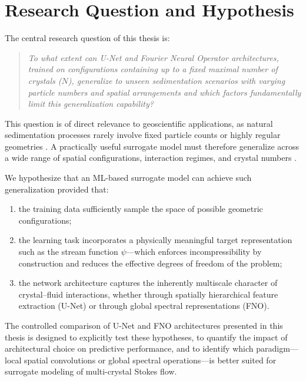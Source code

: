 \section{Research Question and Hypothesis}

The central research question of this thesis is:

\begin{quote}
\emph{To what extent can U-Net and Fourier Neural Operator architectures, trained on configurations containing up to a fixed maximal number of crystals ($N$), generalize to unseen sedimentation scenarios with varying particle numbers and spatial arrangements and which factors fundamentally limit this generalization capability?}
\end{quote}

This question is of direct relevance to geoscientific applications, as natural sedimentation processes rarely involve fixed particle counts or highly regular geometries \parencite{martin_crystal_1988,verhoeven_numerical_2009}. A practically useful surrogate model must therefore generalize across a wide
range of spatial configurations, interaction regimes, and crystal numbers \parencite{morimoto_generalization_2022,lu_comprehensive_2022}.

We hypothesize that an ML-based surrogate model can achieve such generalization provided that:

\begin{enumerate}
    \item the training data sufficiently sample the space of possible geometric configurations;
    \item the learning task incorporates a physically meaningful target representation such as the stream function $\psi$—which enforces incompressibility by construction and reduces the effective degrees of freedom of the problem;
    \item the network architecture captures the inherently multiscale character of crystal--fluid interactions, whether through spatially hierarchical feature extraction (U-Net) or through global spectral representations (FNO).
\end{enumerate}

The controlled comparison of U-Net and FNO architectures presented in this thesis is designed to explicitly test these hypotheses, to quantify the impact of architectural choice on predictive performance, and to identify which paradigm—local spatial convolutions or global spectral operations—is better suited for surrogate modeling of multi-crystal Stokes flow.

